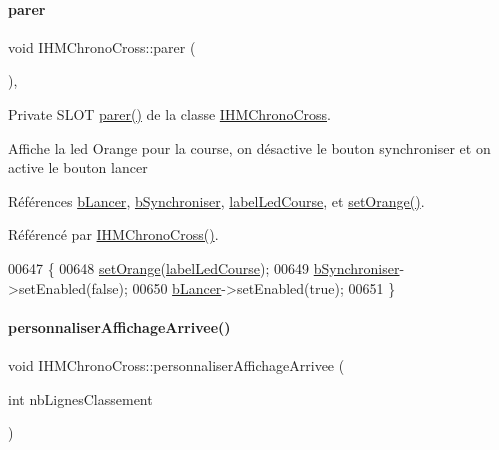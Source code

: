 \paragraph{\texorpdfstring{parer}{parer}}
{\footnotesize\ttfamily void I\+H\+M\+Chrono\+Cross\+::parer (\begin{DoxyParamCaption}{ }\end{DoxyParamCaption})\hspace{0.3cm}{\ttfamily [private]}, {\ttfamily [slot]}}



Private S\+L\+OT \hyperlink{class_i_h_m_chrono_cross_aa272ffa273fc8c487ea64ef6a43b4439}{parer()} de la classe \hyperlink{class_i_h_m_chrono_cross}{I\+H\+M\+Chrono\+Cross}. 

Affiche la led Orange pour la course, on désactive le bouton synchroniser et on active le bouton lancer 

Références \hyperlink{class_i_h_m_chrono_cross_a1b0a7c5e58d6a9f873cdc912d67b8de9}{b\+Lancer}, \hyperlink{class_i_h_m_chrono_cross_aaef501bd1190a5ec06a214d3265b8c0b}{b\+Synchroniser}, \hyperlink{class_i_h_m_chrono_cross_a8568c80f2e2ffe96c81d2a94a2146159}{label\+Led\+Course}, et \hyperlink{class_i_h_m_chrono_cross_a7e2424925f588d7a1914befc3c6c832e}{set\+Orange()}.



Référencé par \hyperlink{class_i_h_m_chrono_cross_a479fc90733fba3e65fb06aa4a3adc02e}{I\+H\+M\+Chrono\+Cross()}.


\begin{DoxyCode}
00647 \{
00648     \hyperlink{class_i_h_m_chrono_cross_a7e2424925f588d7a1914befc3c6c832e}{setOrange}(\hyperlink{class_i_h_m_chrono_cross_a8568c80f2e2ffe96c81d2a94a2146159}{labelLedCourse});
00649     \hyperlink{class_i_h_m_chrono_cross_aaef501bd1190a5ec06a214d3265b8c0b}{bSynchroniser}->setEnabled(\textcolor{keyword}{false});
00650     \hyperlink{class_i_h_m_chrono_cross_a1b0a7c5e58d6a9f873cdc912d67b8de9}{bLancer}->setEnabled(\textcolor{keyword}{true});
00651 \}
\end{DoxyCode}
\mbox{\label{class_i_h_m_chrono_cross_a41c2ff49d25069f8dfa2a7b3d0606d38}} 
\paragraph{\texorpdfstring{personnaliser\+Affichage\+Arrivee()}{personnaliserAffichageArrivee()}}
{\footnotesize\ttfamily void I\+H\+M\+Chrono\+Cross\+::personnaliser\+Affichage\+Arrivee (\begin{DoxyParamCaption}\item[{int}]{nb\+Lignes\+Classement }\end{DoxyParamCaption})\hspace{0.3cm}{\ttfamily [private]}}



